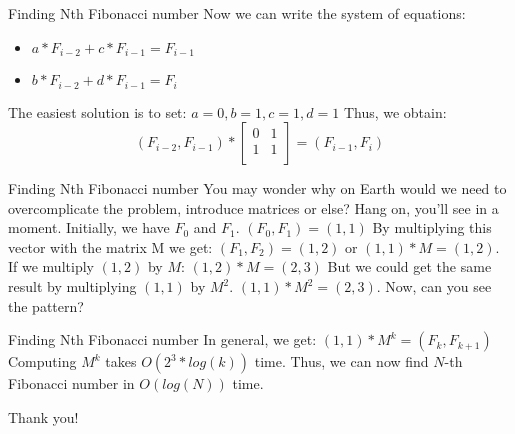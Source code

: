 \documentclass{beamer}
\begin{document}
\begin{frame}{Finding Nth Fibonacci number}
  Now we can write the system of equations:
  \begin{itemize}
    \item 
      $a * F_{i-2} + c * F_{i-1} = F_{i-1}$
    \item
      $b * F_{i-2} + d * F_{i-1} = F_i$
  \end{itemize}
  \pause
  The easiest solution is to set:
  \newline
  $a = 0, b = 1, c = 1, d = 1$
  \pause \newline
  Thus, we obtain:
  \[
    (F_{i-2}, F_{i-1})
    *
    \left[ {
      \begin{array}{cc}
        0 & 1 \\
        1 & 1 \\      
      \end{array} } 
    \right]
    = (F_{i-1}, F_i)
  \]
\end{frame}

\begin{frame}{Finding Nth Fibonacci number}
  You may wonder why on Earth would we need to overcomplicate the problem, introduce matrices or else?
  \newline Hang on, you'll see in a moment.
  \pause \newline
  Initially, we have $F_0$ and $F_1$.
  \newline
  $(F_0, F_1) = (1, 1)$
  \pause \newline
  By multiplying this vector with the matrix M we get:
  \newline
  $(F_1, F_2) = (1, 2)$ or $(1, 1) * M = (1, 2)$.
  \pause \newline
  If we multiply $(1, 2)$ by $M$:
  \newline
  $(1, 2) * M = (2, 3)$
  \pause \newline
  But we could get the same result by multiplying $(1, 1)$ by $M^2$.
  \newline
  $(1, 1) * M^2 = (2, 3)$.
  \pause \newline Now, can you see the pattern?
\end{frame}

\begin{frame}{Finding Nth Fibonacci number}
  In general, we get:
  \newline
  $(1, 1) * M^k = (F_k, F_{k+1})$
  \pause \newline
  Computing $M^k$ takes $O(2^3 * log(k))$ time. 
  \newline
  Thus, we can now find $N$-th Fibonacci number in $O(log(N))$ time.
\end{frame}

\begin{frame}{}
		\LARGE{\centerline{Thank you!}}
\end{frame}
\end{document}
